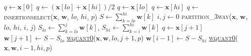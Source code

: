 \documentclass[a4paper,oneside,11pt,DIV=12]{scrartcl}
\begin{document}
\begin{algorithmic}[1]
	\hypertarget{alg:wquant0}{}
			\State $q \gets \bm x[0]$
			\State \Return
		\EndIf
				\State $q \gets (\bm x[lo] + \bm x[hi]) / 2$
				\State \Return
				\State $q \gets \bm x[lo]$
				\State \Return
			\Else
				\State $q \gets \bm x[hi]$
				\State \Return
			\EndIf
		\EndIf
 			\State $q \gets$ \textsc{insertionselect}($\bm x$, $\bm w$, $lo$, $hi$, $p$)
		\EndIf
		\State $S \gets \sum_{k=lo}^{hi} \bm w[k]$
		\State $i,j \gets 0$
		\State \textsc{partition\_3way($\bm x$, $\bm w$, $lo$, $hi$, $i$, $j$)}
		\State $S_{lo} \gets \sum_{k=lo}^j \bm w[k]$, \quad $S_{hi} \gets \sum_{k=i}^{hi} \bm w[k]$
			\State $q \gets \bm x[j + 1]$
			\State \Return
		\Else
				\State $\bm w[j+1] \gets S - S_{lo}$
				\State \hyperlink{alg:wquant0}{\textsc{wquant0}}($\bm x, \bm w, lo, j + 1, p$) 
			\Else
				\State $\bm w[i-1] \gets S - S_{hi}$
				\State \hyperlink{alg:wquant0}{\textsc{wquant0}}($\bm x, \bm w, i-1, hi, p$) 
			\EndIf
		\EndIf
	\EndFunction
\end{algorithmic}
\end{document}
